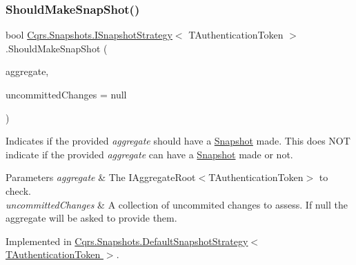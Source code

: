 \mbox{\label{interfaceCqrs_1_1Snapshots_1_1ISnapshotStrategy_aeb5fc714ec8a5b60219426f3aabc0f6c_aeb5fc714ec8a5b60219426f3aabc0f6c}} 
\subsubsection{\texorpdfstring{Should\+Make\+Snap\+Shot()}{ShouldMakeSnapShot()}}
{\footnotesize\ttfamily bool \hyperlink{interfaceCqrs_1_1Snapshots_1_1ISnapshotStrategy}{Cqrs.\+Snapshots.\+I\+Snapshot\+Strategy}$<$ T\+Authentication\+Token $>$.Should\+Make\+Snap\+Shot (\begin{DoxyParamCaption}\item[{\hyperlink{interfaceCqrs_1_1Domain_1_1IAggregateRoot}{I\+Aggregate\+Root}$<$ T\+Authentication\+Token $>$}]{aggregate,  }\item[{I\+Enumerable$<$ \hyperlink{interfaceCqrs_1_1Events_1_1IEvent}{I\+Event}$<$ T\+Authentication\+Token $>$$>$}]{uncommitted\+Changes = {\ttfamily null} }\end{DoxyParamCaption})}



Indicates if the provided {\itshape aggregate}  should have a \hyperlink{classCqrs_1_1Snapshots_1_1Snapshot}{Snapshot} made. This does N\+OT indicate if the provided {\itshape aggregate}  can have a \hyperlink{classCqrs_1_1Snapshots_1_1Snapshot}{Snapshot} made or not. 


\begin{DoxyParams}{Parameters}
{\em aggregate} & The I\+Aggregate\+Root$<$\+T\+Authentication\+Token$>$ to check.\\
\hline
{\em uncommitted\+Changes} & A collection of uncommited changes to assess. If null the aggregate will be asked to provide them.\\
\hline
\end{DoxyParams}


Implemented in \hyperlink{classCqrs_1_1Snapshots_1_1DefaultSnapshotStrategy_a9cdb3d79c55e2eb2796639b273d49ed9_a9cdb3d79c55e2eb2796639b273d49ed9}{Cqrs.\+Snapshots.\+Default\+Snapshot\+Strategy$<$ T\+Authentication\+Token $>$}.

